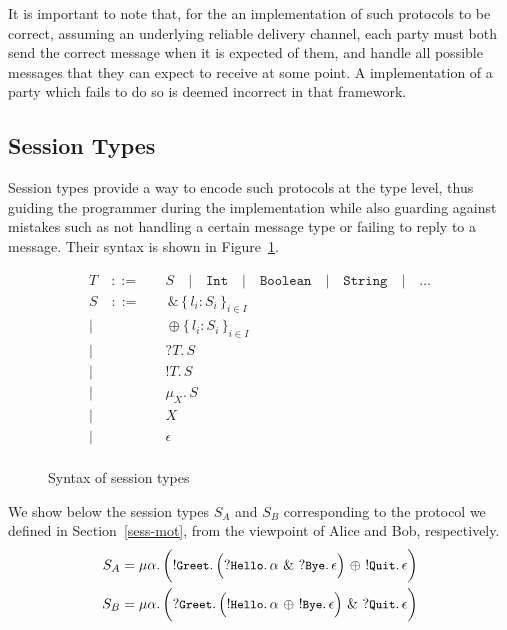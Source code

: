 \documentclass[a4paper,twoside]{article}
\newcommand{\RefSec}[1]{Section~\ref{#1}}
\newcommand{\RefFig}[1]{Figure~\ref{#1}}
\newcommand{\stt}[1]{\texttt{\small{#1}}}
\begin{document}
It is important to note that, for the an implementation of such protocols to be correct, assuming an underlying reliable delivery channel, each party must both send the correct message when it is expected of them, and handle all possible messages that they can expect to receive at some point. A implementation of a party which fails to do so is deemed incorrect in that framework.

\subsection{Session Types}

Session types \cite{Honda:1998:LPT:645392.651876} provide a way to encode such protocols at the type level, thus guiding the programmer during the implementation while also guarding against mistakes such as not handling a certain message type or failing to reply to a message. Their syntax is shown in \RefFig{fig:sess-syntax}.

\begin{figure}
\begin{align*}
T\quad::=&\quad 	S
   \quad|\quad \texttt{Int}
   \quad|\quad \texttt{Boolean}
   \quad|\quad \texttt{String}
   \quad|\quad \ldots \tag*{payload}
\\
S\quad::=&\quad 	\,\&\,\{\,l_i: S_i\,\}_{i\in I}			\tag*{branching}\\
        |&\quad 	\oplus\{\,l_i: S_i\,\}_{i\in I}			\tag*{selection}\\
		|&\quad 	?T.\, S									\tag*{receive}\\
		|&\quad 	!T.\, S									\tag*{send}\\
        |&\quad		\mu_X.\, S								\tag*{recursion}\\
        |&\quad 	X  										\tag*{variable}\\
        |&\quad 	\epsilon								\tag*{termination}\\
\end{align*}
\vspace{-20pt}
\caption{Syntax of session types \label{fig:sess-syntax}}
\end{figure}

We show below the session types $S_A$ and $S_B$ corresponding to the protocol we defined in \RefSec{sess-mot}, from the viewpoint of Alice and Bob, respectively.
\begin{align*}
S_A &= \mu\alpha.\,\bigg(!\stt{Greet}.\,\Big(?\stt{Hello}.\,\alpha\ \&\ ?\stt{Bye}.\, \epsilon \Big)\ \oplus\ !\stt{Quit}.\,\epsilon \bigg)\\
S_B &= \mu\alpha.\,\bigg(?\stt{Greet}.\,\Big(!\stt{Hello}.\,\alpha\ \oplus\ !\stt{Bye}.\, \epsilon \Big)\ \&\ ?\stt{Quit}.\,\epsilon \bigg)\\
\end{align*}
\vspace{-30pt}
\end{document}
